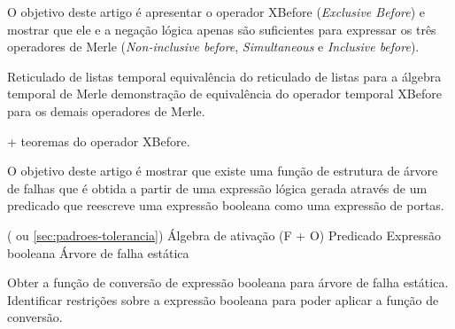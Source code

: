 \documentclass[a5paper,portuges]{article}
\begin{document}
\begin{artigo}
\label{art:xbefore}
\begin{objetivo}
O objetivo deste artigo é apresentar o operador XBefore (\emph{Exclusive Before}) e mostrar que ele e a negação lógica apenas são suficientes para expressar os três operadores de Merle (\emph{Non-inclusive before}, \emph{Simultaneous} e \emph{Inclusive before}).
\end{objetivo}

\begin{fluxo}
Reticulado de listas temporal \passofluxo equivalência do reticulado de listas para a álgebra temporal de Merle \passofluxo demonstração de equivalência do operador temporal XBefore para os demais operadores de Merle.
\end{fluxo}

\begin{paraconseguir}
 + teoremas do operador XBefore. 
\end{paraconseguir}

\begin{submissao}
  \item 
\end{submissao}
\end{artigo}

\begin{artigo}
\label{sec:ft-de-expressao}
\begin{objetivo}
O objetivo deste artigo é mostrar que existe uma função de estrutura de árvore de falhas que é obtida a partir de uma expressão lógica gerada através de um predicado que reescreve uma expressão booleana como uma expressão de portas.
\end{objetivo}

\begin{fluxo}
( ou \cref{sec:padroes-tolerancia}) \passofluxo Álgebra de ativação (F + O) \passofluxo Predicado \passofluxo Expressão booleana \passofluxo Árvore de falha estática
\end{fluxo}

\begin{paraconseguir}
Obter a função de conversão de expressão booleana para árvore de falha estática. Identificar restrições sobre a expressão booleana para poder aplicar a função de conversão. 
\end{paraconseguir}

\begin{submissao}
  \item 
\end{submissao}


\end{artigo}
\end{document}
